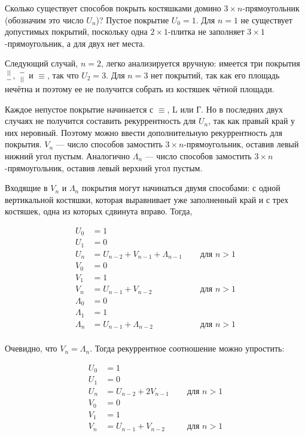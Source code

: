 \documentclass[14pt,openany]{book}
\begin{document}
Сколько существует способов покрыть костяшками домино $3 \times n$-прямоугольник
(обозначим это число $U_n$)? Пустое покрытие $U_0 = 1$. Для $n=1$ не существует допустимых
покрытий, поскольку одна $2\times 1$-плитка не заполняет $3 \times 1$-прямоугольник,
а для двух нет места.

Следующий случай, $n=2$, легко анализируется вручную: имеется три покрытия ${||}\atop{-}$,
${-}\atop{||}$ и $\equiv$, так что $U_2 = 3$. Для $n=3$ нет покрытий, так как его
площадь нечётна и поэтому ее не получится собрать из костяшек чётной площади.

Каждое непустое покрытие начинается с $\equiv$, L или Г. Но в последних двух случаях
не получится составить рекуррентность для $U_n$, так как правый край у них неровный.
Поэтому можно ввести дополнительную рекуррентность для покрытия. $V_n$  --- число
способов замостить $3\times n$-прямоугольник, оставив левый нижний угол пустым.
Аналогично $\Lambda_n$ --- число
способов замостить $3\times n$-прямоугольник, оставив левый верхний угол пустым.

Входящие в $V_n$ и $\Lambda_n$ покрытия могут начинаться двумя способами: с одной вертикальной
костяшки, которая выравнивает уже заполненный край и с трех костяшек, одна из которых сдвинута вправо.
Тогда,

\begin{align*}
U_0 &= 1 \\
U_1 &= 0 \\
U_n &= U_{n-2} + V_{n-1} + \Lambda_{n-1} \quad & \text{ для $n>1$}\\
V_0 &= 0 \\
V_1 &= 1 \\
V_n &= U_{n-1} + V_{n-2} & \text{ для $n>1$}\\
\Lambda_0 &= 0 \\
\Lambda_1 &= 1 \\
\Lambda_n &= U_{n-1} + \Lambda_{n-2} & \text{ для $n>1$}\\
\end{align*}

Очевидно, что $V_n = \Lambda_n$. Тогда рекуррентное соотношение можно упростить:

\begin{align*}
U_0 &= 1 \\
U_1 &= 0 \\
U_n &= U_{n-2} + 2V_{n-1} \quad & \text{ для $n>1$}\\
V_0 &= 0 \\
V_1 &= 1 \\
V_n &= U_{n-1} + V_{n-2} & \text{ для $n>1$}\\
\end{align*}
\end{document}
